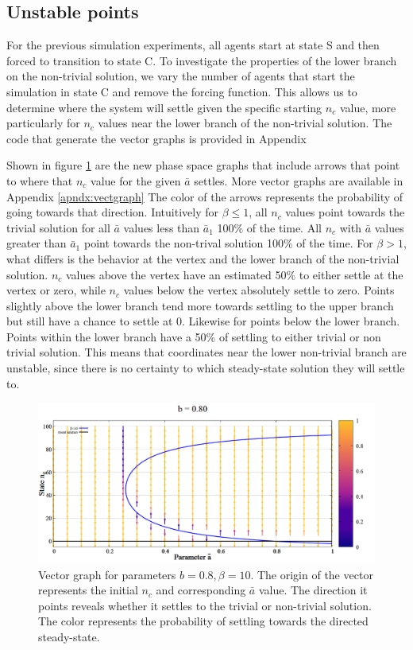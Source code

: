 \subsection{Unstable points}
\hspace{\parindent}For the previous simulation experiments, all agents start at state S and then forced to transition to state C. 
To investigate the properties of the lower branch on the non-trivial solution, we vary the number of agents that start the simulation in state C and remove the forcing function. 
This allows us to determine where the system will settle given the specific starting $n_{c}$ value, more particularly for $n_{c}$ values near the lower branch of the non-trivial solution. 
The code that generate the vector graphs is provided in Appendix %

Shown in figure \ref{fig:vectorplot} are the new phase space graphs that include arrows that point to where that $n_{c}$ value for the given $\bar{a}$ settles.
More vector graphs are available in Appendix \ref{apndx:vectgraph}
The color of the arrows represents the probability of going towards that direction.
Intuitively for $\beta \leq 1$, all $n_{c}$ values point towards the trivial solution for all $\bar{a}$ values less than  $\bar{a}_{1}$ 100\% of the time. 
All $n_{c}$ with $\bar{a}$ values greater than $\bar{a}_{1}$ point towards the non-trival solution 100\% of the time.
For $\beta > 1$, what differs is the behavior at the vertex and the lower branch of the non-trivial solution.
$n_{c}$ values above the vertex have an estimated 50\% to either settle at the vertex or zero, while $n_{c}$ values below the vertex absolutely settle to zero.
Points slightly above the lower branch tend more towards settling to the upper branch but still have a chance to settle at 0.
Likewise for points below the lower branch.
Points within the lower branch have a 50\% of settling to either trivial or non trivial solution.
This means that coordinates near the lower non-trivial branch are unstable, since there is no certainty to which steady-state solution they will settle to.

\begin{figure}[h!]
 \centering
  \includegraphics[width=\linewidth]{images/appendix/vectors/4.png}
  \caption{Vector graph for parameters $b = 0.8, \beta = 10$. The origin of the vector represents the initial $n_{c}$ and corresponding $\bar{a}$ value. The direction it points reveals whether it settles to the trivial or non-trivial solution. The color represents the probability of settling towards the directed steady-state.}
  \label{fig:vectorplot}
\end{figure}

